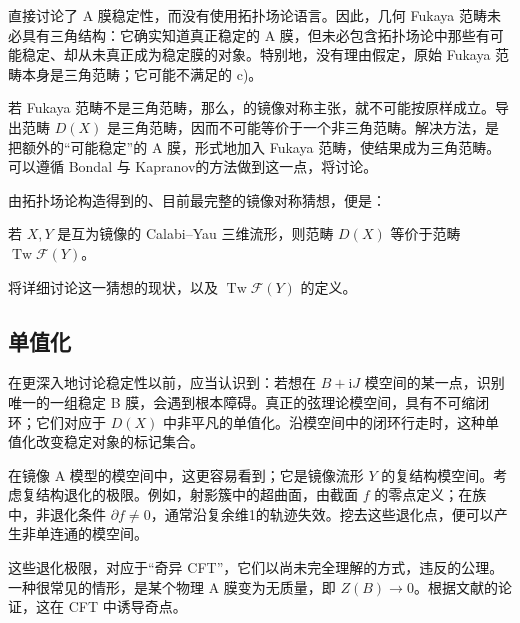 直接讨论了 A 膜稳定性，而没有使用拓扑场论语言。因此，几何 Fukaya 范畴未必具有三角结构：它确实知道真正稳定的 A 膜，但未必包含拓扑场论中那些有可能稳定、却从未真正成为稳定膜的对象。特别地，没有理由假定，原始 Fukaya 范畴本身是三角范畴；它可能不满足的 c)。

若 Fukaya 范畴不是三角范畴，那么，的镜像对称主张，就不可能按原样成立。导出范畴 $D(X)$ 是三角范畴，因而不可能等价于一个非三角范畴。解决方法，是把额外的“可能稳定”的 A 膜，形式地加入 Fukaya 范畴，使结果成为三角范畴。可以遵循 Bondal 与 Kapranov的方法做到这一点，将讨论。

由拓扑场论构造得到的、目前最完整的镜像对称猜想，便是：
\begin{conjecture}\label{conj:5.29}
若 $X,Y$ 是互为镜像的 Calabi--Yau 三维流形，则范畴 $D(X)$ 等价于范畴 $\operatorname{Tw}\mathcal{F}(Y)$。
\end{conjecture}

将详细讨论这一猜想的现状，以及 $\operatorname{Tw}\mathcal{F}(Y)$ 的定义。

\subsection{单值化}\label{sec:5.5.3}

在更深入地讨论稳定性以前，应当认识到：若想在 $B+\mathrm{i}J$ 模空间的某一点，识别唯一的一组稳定 B 膜，会遇到根本障碍。真正的弦理论模空间，具有不可缩闭环；它们对应于 $D(X)$ 中非平凡的单值化。沿模空间中的闭环行走时，这种单值化改变稳定对象的标记集合。

在镜像 A 模型的模空间中，这更容易看到；它是镜像流形 $Y$ 的复结构模空间。考虑复结构退化的极限。例如，射影簇中的超曲面，由截面 $f$ 的零点定义；在族中，非退化条件 $\partial f\ne0$，通常沿复余维1的轨迹失效。挖去这些退化点，便可以产生非单连通的模空间。

这些退化极限，对应于“奇异 CFT”，它们以尚未完全理解的方式，违反的公理。一种很常见的情形，是某个物理 A 膜变为无质量，即 $Z(B)\to0$。根据文献的论证，这在 CFT 中诱导奇点。

